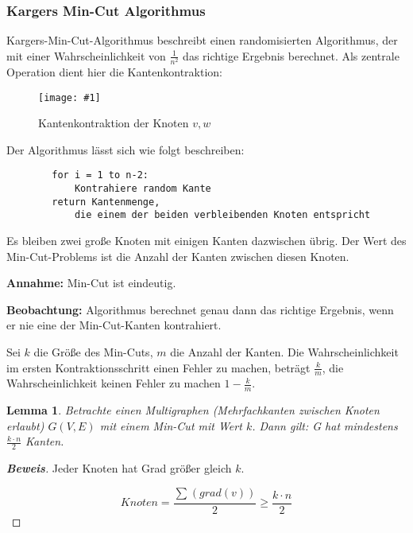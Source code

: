 \documentclass{scrartcl}%
\newtheorem{theorem}{Lemma}
\newcommand{\includepic}[2]{\texttt{[image: \#1]}}
\begin{document}
    \subsubsection*{Kargers Min-Cut Algorithmus}
    \label{subsubsec:kargersMincutAlgorithmus}

    Kargers-Min-Cut-Algorithmus beschreibt einen randomisierten Algorithmus, der mit einer
    Wahrscheinlichkeit von $\frac{1}{n^2}$ das richtige Ergebnis berechnet.
    Als zentrale Operation dient hier die Kantenkontraktion:

    \begin{figure}[htb]
        \centering
        \includepic{lec_02_c}{0.7}
        \caption{Kantenkontraktion der Knoten $v, w$}
    \end{figure}

    Der Algorithmus lässt sich wie folgt beschreiben:

    \begin{lstlisting}
        for i = 1 to n-2:
            Kontrahiere random Kante
        return Kantenmenge,
            die einem der beiden verbleibenden Knoten entspricht
    \end{lstlisting}

    Es bleiben zwei große Knoten mit einigen Kanten dazwischen übrig.
    Der Wert des Min-Cut-Problems ist die Anzahl der Kanten zwischen diesen Knoten.

    \textbf{\textsf{Annahme:}}  Min-Cut ist eindeutig.

    \textbf{\textsf{Beobachtung:}} Algorithmus berechnet genau dann das richtige Ergebnis, wenn er nie eine der Min-Cut-Kanten kontrahiert.

    Sei $k$ die Größe des Min-Cuts, $m$ die Anzahl der Kanten.
    Die Wahrscheinlichkeit im ersten Kontraktionsschritt einen Fehler zu machen, beträgt $\frac{k}{m}$,
    die Wahrscheinlichkeit keinen Fehler zu machen $1-\frac{k}{m}$.

    \begin{theorem}
        Betrachte einen Multigraphen (Mehrfachkanten zwischen Knoten erlaubt) $G(V,E)$ mit einem Min-Cut mit Wert $k$.
        Dann gilt: G hat mindestens $\frac{k \cdot n}{2}$ Kanten.
    \end{theorem}

    \begin{proof}[\textbf{Beweis}]
        Jeder Knoten hat Grad größer gleich $k$.

        \begin{equation*}
            Knoten = \frac{\sum_{}^{}(grad(v))}{2} \geq \frac{k \cdot n}{2}
        \end{equation*}
    \end{proof}
\end{document}
